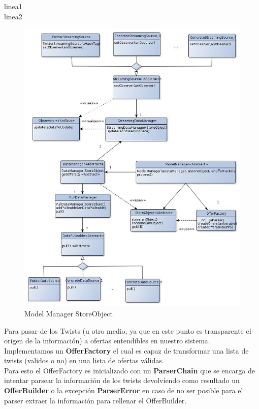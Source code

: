 \documentclass[10pt, a4paper]{article}
\begin{document}
\newpage
linea1\\
linea2\\
\begin{figure}[H]
\centering
\includegraphics[scale=0.6]{graphics/model_manager_storeObject_class.jpg}
\caption{Model Manager StoreObject}
\end{figure}

\newpage
Para pasar de los Twists (u otro medio, ya que en este punto es transparente el origen de la información) a ofertas entendibles en nuestro sistema. Implementamos un \textbf{OfferFactory} el cual es capaz de transformar una lista de twists (validos o no) en una lista de ofertas válidas.\\

Para esto el OfferFactory es inicializado con un \textbf{ParserChain} que se encarga de intentar parsear la información de los twists devolviendo como resultado un \textbf{OfferBuilder} o la excepción  \textbf{ParserError} en caso de no ser posible para el parser extraer la información para rellenar el OfferBuilder.\\
\end{document}
